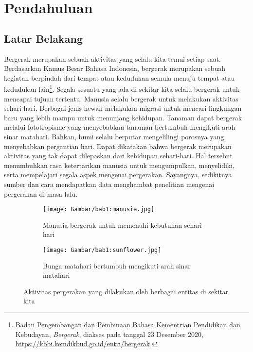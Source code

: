 \chapter{Pendahuluan}
\label{chap:intro}
   
\section{Latar Belakang}
\label{sec:label}

Bergerak merupakan sebuah aktivitas yang selalu kita temui setiap saat. Berdasarkan Kamus Besar Bahasa Indonesia, bergerak merupakan sebuah kegiatan berpindah dari tempat atau kedudukan semula menuju tempat atau kedudukan lain\footnote{Badan Pengembangan dan Pembinaan Bahasa Kementrian Pendidikan dan Kebudayan, \textit{Bergerak}, diakses pada tanggal 23 Desember 2020, \url{https://kbbi.kemdikbud.go.id/entri/bergerak}.}. Segala sesuatu yang ada di sekitar kita selalu bergerak untuk mencapai tujuan tertentu. Manusia selalu bergerak untuk melakukan aktivitas sehari-hari. Berbagai jenis hewan melakukan migrasi untuk mencari lingkungan baru yang lebih mampu untuk menunjang kehidupan. Tanaman dapat bergerak melalui fototropisme yang menyebabkan tanaman bertumbuh mengikuti arah sinar matahari. Bahkan, bumi selalu berputar mengelilingi porosnya yang menyebabkan pergantian hari. Dapat dikatakan bahwa bergerak merupakan aktivitas yang tak dapat dilepaskan dari kehidupan sehari-hari. Hal tersebut menumbuhkan rasa ketertarikan manusia untuk mengumpulkan, menyelidiki, serta mempelajari segala aspek mengenai pergerakan. Sayangnya, sedikitnya sumber dan cara mendapatkan data menghambat penelitian mengenai pergerakan di masa lalu.

\begin{figure}[h]
    \centering
    \begin{subfigure}[b]{0.45\textwidth}
        \texttt{[image: Gambar/bab1:manusia.jpg]}
        \caption{Manusia bergerak untuk memenuhi kebutuhan sehari-hari\protect\footnotemark}
        \label{bab1:manusia}
    \end{subfigure}
    \begin{subfigure}[b]{0.45\textwidth}
        \texttt{[image: Gambar/bab1:sunflower.jpg]}
        \caption{Bunga matahari bertumbuh mengikuti arah sinar matahari\protect\footnotemark}
        \label{bab1:sunflower}
    \end{subfigure}
    \caption[Aktivitas pergerakan]{
    Aktivitas pergerakan yang dilakukan oleh berbagai entitas di sekitar kita}
    \label{bab1:pergerakan}
\end{figure}

